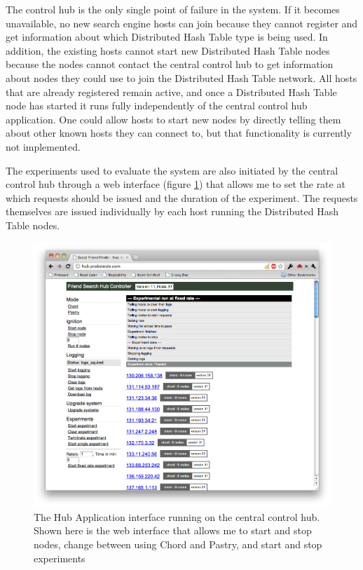 The control hub is the only single point of failure in the system. If it becomes unavailable, no new search engine hosts can join because they cannot register and get information about which Distributed Hash Table type is being used. In addition, the existing hosts cannot start new Distributed Hash Table nodes because the nodes cannot contact the central control hub to get information about nodes they could use to join the Distributed Hash Table network. All hosts that are already registered remain active, and once a Distributed Hash Table node has started it runs fully independently of the central control hub application.
One could allow hosts to start new nodes by directly telling them about other known hosts they can connect to, but that functionality is currently not implemented.

The experiments used to evaluate the system are also initiated by the central control hub through a web interface (figure \ref{figHubApp}) that allows me to set the rate at which requests should be issued and the duration of the experiment. The requests themselves are issued individually by each host running the Distributed Hash Table nodes.

\begin{figure}[!htb]
\begin{center}
	\includegraphics[width=0.9\linewidth]{illustrations/HubApp.png}
\caption{The Hub Application interface running on the central control hub. Shown here is the web interface that allows me to start and stop nodes, change between using Chord and Pastry, and start and stop experiments}
\label{figHubApp}
\end{center}
\end{figure}

